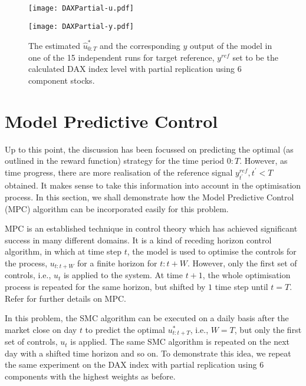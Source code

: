 \begin{figure}[htbp]
\centering
    \begin{minipage}{0.5\textwidth}
        \centering
        \texttt{[image: DAXPartial-u.pdf]}
    \end{minipage}%
    \begin{minipage}{0.5\textwidth}
        \centering
        \texttt{[image: DAXPartial-y.pdf]}
    \end{minipage}
\caption{The estimated $\hat{u}^*_{0:T}$ and the corresponding $y$ output of the model in one of the 15 independent runs for target reference, $y^{ref}$ set to be the calculated DAX index level with partial replication using $6$ component stocks.}
\label{fig:daxpartial}
\end{figure}

\section{Model Predictive Control}
Up to this point, the discussion has been focussed on predicting the optimal (as outlined in the reward function) strategy for the time period $0:T$. However, as time progress, there are more realisation of the reference signal $y^{ref}_{t^\prime}, t^\prime < T$ obtained. It makes sense to take this information into account in the optimisation process. In this section, we shall demonstrate how the Model Predictive Control (MPC) algorithm can be incorporated easily for this problem.

MPC is an established technique in control theory which has achieved significant success in many different domains. It is a kind of receding horizon control algorithm, in which at time step $t$, the model is used to optimise the controls for the process, $u_{t:t+W}$ for a finite horizon for $t:t+W$. However, only the first set of controls, i.e., $u_{t}$ is applied to the system. At time $t+1$, the whole optimisation process is repeated for the same horizon, but shifted by $1$ time step until $t=T$. Refer \cite{GCE89} for further details on MPC. 

In this problem, the SMC algorithm can be executed on a daily basis after the market close on day $t$ to predict the optimal $u^*_{t:t+T}$, i.e., $W=T$, but only the first set of controls, $u_t$ is applied. The same SMC algorithm is repeated on the next day with a shifted time horizon and so on. To demonstrate this idea, we repeat the same experiment on the DAX index with partial replication using $6$ components with the highest weights as before.

